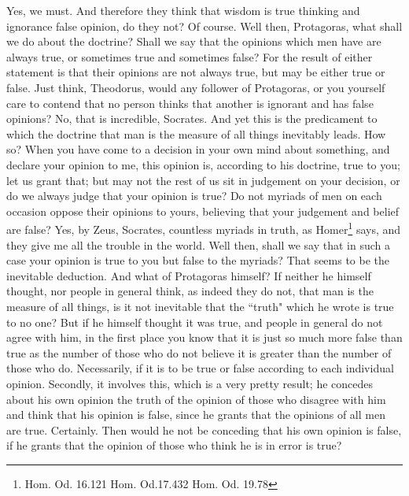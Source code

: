 \documentclass[letterpaper,12pt]{article}
\newcommand{\stephpag}[1]{\marginnote{\small\itshape\fontfamily{ppl}\selectfont #1}}
\begin{document}
\begin{drama}
\theodorusspeaks
Yes, we must.
\socratesspeaks
And therefore they think that wisdom is true thinking and ignorance false opinion, do they not? \stephpag{c}
\theodorusspeaks
Of course.
\socratesspeaks
Well then, Protagoras, what shall we do about the doctrine? Shall we say that the opinions which men have are always true, or sometimes true and sometimes false? For the result of either statement is that their opinions are not always true, but may be either true or false. Just think, Theodorus, would any follower of Protagoras, or you yourself care to contend that no person thinks that another is ignorant and has false opinions?
\theodorusspeaks
No, that is incredible, Socrates. \stephpag{d}
\socratesspeaks
And yet this is the predicament to which the doctrine that man is the measure of all things inevitably leads.
\theodorusspeaks
How so?
\socratesspeaks
When you have come to a decision in your own mind about something, and declare your opinion to me, this opinion is, according to his doctrine, true to you; let us grant that; but may not the rest of us sit in judgement on your decision, or do we always judge that your opinion is true? Do not myriads of men on each occasion oppose their opinions to yours, believing that your judgement and belief are false? \stephpag{e}
\theodorusspeaks
Yes, by Zeus, Socrates, countless myriads in truth, as Homer\footnote{Hom. Od. 16.121 Hom. Od.17.432 Hom. Od. 19.78} says, and they give me all the trouble in the world.
\socratesspeaks
Well then, shall we say that in such a case your opinion is true to you but false to the myriads?
\theodorusspeaks
That seems to be the inevitable deduction.
\socratesspeaks
And what of Protagoras himself? If neither he himself thought, nor people in general think, as indeed they do not, that man is the measure of all things, is it not inevitable that the ``truth" which he wrote is true to no one? But if he himself thought it was true, \stephpag{171 a} and people in general do not agree with him, in the first place you know that it is just so much more false than true as the number of those who do not believe it is greater than the number of those who do.
\theodorusspeaks
Necessarily, if it is to be true or false according to each individual opinion.
\socratesspeaks
Secondly, it involves this, which is a very pretty result; he concedes about his own opinion the truth of the opinion of those who disagree with him and think that his opinion is false, since he grants that the opinions of all men are true.
\theodorusspeaks
Certainly. \stephpag{b}
\socratesspeaks
Then would he not be conceding that his own opinion is false, if he grants that the opinion of those who think he is in error is true?

\end{drama}
\end{document}
